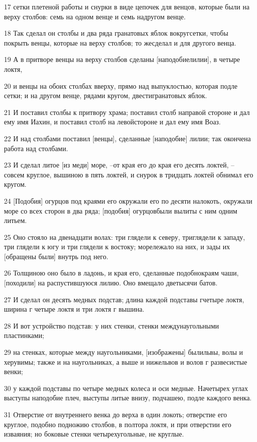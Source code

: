 \par 17 сетки плетеной работы и снурки в виде цепочек для венцов, которые были на верху столбов: семь на одном венце и семь надругом венце.
\par 18 Так сделал он столбы и два ряда гранатовых яблок вокругсетки, чтобы покрыть венцы, которые на верху столбов; то жесделал и для другого венца.
\par 19 А в притворе венцы на верху столбов сделаны [наподобиелилии], в четыре локтя,
\par 20 и венцы на обоих столбах вверху, прямо над выпуклостью, которая подле сетки; и на другом венце, рядами кругом, двестигранатовых яблок.
\par 21 И поставил столбы к притвору храма; поставил столб направой стороне и дал ему имя Иахин, и поставил столб на левойстороне и дал ему имя Воаз.
\par 22 И над столбами поставил [венцы], сделанные [наподобие] лилии; так окончена работа над столбами.
\par 23 И сделал литое [из меди] море, --от края его до края его десять локтей, --совсем круглое, вышиною в пять локтей, и снурок в тридцать локтей обнимал его кругом.
\par 24 [Подобия] огурцов под краями его окружали его по десяти налокоть, окружали море со всех сторон в два ряда; [подобия] огурцовбыли вылиты с ним одним литьем.
\par 25 Оно стояло на двенадцати волах: три глядели к северу, триглядели к западу, три глядели к югу и три глядели к востоку; морележало на них, и зады их [обращены были] внутрь под него.
\par 26 Толщиною оно было в ладонь, и края его, сделанные подобнокраям чаши, [походили] на распустившуюся лилию. Оно вмещало дветысячи батов.
\par 27 И сделал он десять медных подстав; длина каждой подставы гчетыре локтя, ширина г четыре локтя и три локтя г вышина.
\par 28 И вот устройство подстав: у них стенки, стенки междунаугольными пластинками;
\par 29 на стенках, которые между наугольниками, [изображены] былильвы, волы и херувимы; также и на наугольниках, а выше и нижельвов и волов г развесистые венки;
\par 30 у каждой подставы по четыре медных колеса и оси медные. Начетырех углах выступы наподобие плеч, выступы литые внизу, подчашею, подле каждого венка.
\par 31 Отверстие от внутреннего венка до верха в один локоть; отверстие его круглое, подобно подножию столбов, в полтора локтя, и при отверстии его изваяния; но боковые стенки четырехугольные, не круглые.
